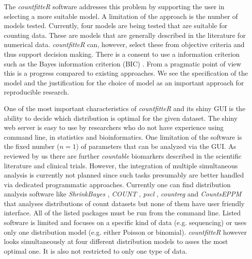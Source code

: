 The \emph{countfitteR} software addresses this problem by supporting the user in selecting a more suitable model. A limitation of the approach is the number of models tested. Currently, four models are being tested that are suitable for counting data. These are models that are generally described in the literature for numerical data. \emph{countfitteR} can, however, select these from objective criteria and thus support decision making. There is a consent to use a information criterion such as the Bayes information criterion (BIC) \citep{myung_counting_2000, zucchini_introduction_2000}. From a pragmatic point of view this is a progress compared to existing approaches. We see the specification of the model and the justification for the choice of model as an important approach for reproducible research.

One of the most important characteristics of \emph{countfitteR} and its shiny GUI is the ability to  decide which distribution is optimal for the given dataset. The shiny web server is easy to use by researchers who do not have experience using command line, in statistics and bioinformatics. One limitation of the software is the fixed number ($n = 1$) of parameters that can be analyzed via the GUI. As reviewed by us \citep{ruhe_molecular_2019} there are further \textit{countable} biomarkers described in the scientific literature and clinical trials. However, the integration of multiple simultaneous analysis is currently not planned since such tasks presumably are better handled via dedicated programmatic approaches.
Currently one can find distribution analysis software like \emph{ShrinkBayes} \citep{shrinkbayes}, \emph{COUNT} \citep{COUNT}, \emph{pscl} \citep{pscl}, \emph{countreg} \citep{countreg} and \emph{CountsEPPM} \citep{countseppm} that analyses distributions of count datasets but none of them have user friendly interface. All of the listed packages must be run from the command line. 
Listed software is limited and focuses on a specific kind of data (e.g. sequencing) or uses only one distribution model (e.g. either Poisson or binomial). \emph{countfitteR} however looks simultaneously at four different distribution models to asses the most optimal one. It is also not restricted to only one type of data. 

